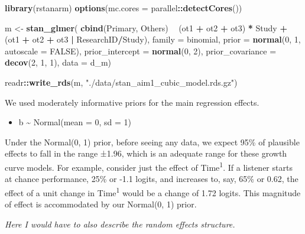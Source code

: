 \documentclass [11pt, proquest] {uwthesis}[2015/03/03]
\providecommand{\tightlist}{%
  \setlength{\itemsep}{0pt}\setlength{\parskip}{0pt}}
\newenvironment{Shaded}{}{}
\newcommand{\KeywordTok}[1]{\textcolor[rgb]{0.00,0.44,0.13}{\textbf{{#1}}}}
\newcommand{\DataTypeTok}[1]{\textcolor[rgb]{0.56,0.13,0.00}{{#1}}}
\newcommand{\DecValTok}[1]{\textcolor[rgb]{0.25,0.63,0.44}{{#1}}}
\newcommand{\StringTok}[1]{\textcolor[rgb]{0.25,0.44,0.63}{{#1}}}
\newcommand{\OtherTok}[1]{\textcolor[rgb]{0.00,0.44,0.13}{{#1}}}
\newcommand{\NormalTok}[1]{{#1}}
\newcommand{\OperatorTok}[1]{\textcolor[rgb]{0.00,0.44,0.13}{\textbf{{#1}}}}
\begin{document}
\begin{Shaded}
\begin{Highlighting}[]
\KeywordTok{library}\NormalTok{(rstanarm)}
\KeywordTok{options}\NormalTok{(}\DataTypeTok{mc.cores =}\NormalTok{ parallel}\OperatorTok{::}\KeywordTok{detectCores}\NormalTok{())}

\NormalTok{m <-}\StringTok{ }\KeywordTok{stan_glmer}\NormalTok{(}
  \KeywordTok{cbind}\NormalTok{(Primary, Others) }\OperatorTok{~}
\StringTok{    }\NormalTok{(ot1 }\OperatorTok{+}\StringTok{ }\NormalTok{ot2 }\OperatorTok{+}\StringTok{ }\NormalTok{ot3) }\OperatorTok{*}\StringTok{ }\NormalTok{Study }\OperatorTok{+}
\StringTok{    }\NormalTok{(ot1 }\OperatorTok{+}\StringTok{ }\NormalTok{ot2 }\OperatorTok{+}\StringTok{ }\NormalTok{ot3 }\OperatorTok{|}\StringTok{ }\NormalTok{ResearchID}\OperatorTok{/}\NormalTok{Study),}
  \DataTypeTok{family =}\NormalTok{ binomial,}
  \DataTypeTok{prior =} \KeywordTok{normal}\NormalTok{(}\DecValTok{0}\NormalTok{, }\DecValTok{1}\NormalTok{, }\DataTypeTok{autoscale =} \OtherTok{FALSE}\NormalTok{),}
  \DataTypeTok{prior_intercept =} \KeywordTok{normal}\NormalTok{(}\DecValTok{0}\NormalTok{, }\DecValTok{2}\NormalTok{),}
  \DataTypeTok{prior_covariance =} \KeywordTok{decov}\NormalTok{(}\DecValTok{2}\NormalTok{, }\DecValTok{1}\NormalTok{, }\DecValTok{1}\NormalTok{),}
  \DataTypeTok{data =}\NormalTok{ d_m)}

\NormalTok{readr}\OperatorTok{::}\KeywordTok{write_rds}\NormalTok{(m, }\StringTok{"./data/stan_aim1_cubic_model.rds.gz"}\NormalTok{)}
\end{Highlighting}
\end{Shaded}
We used moderately informative priors for the main regression effects.
\begin{itemize}
\tightlist
\item
  b \textasciitilde{} Normal(mean = 0, sd = 1)
\end{itemize}
Under the Normal(0, 1) prior, before seeing any data, we expect 95\% of
plausible effects to fall in the range ±1.96, which is an adequate range
for these growth curve models. For example, consider just the effect of
Time\textsuperscript{1}. If a listener starts at chance performance,
25\% or -1.1 logits, and increases to, say, 65\% or 0.62, the effect of
a unit change in Time\textsuperscript{1} would be a change of 1.72
logits. This magnitude of effect is accommodated by our Normal(0, 1)
prior.

\emph{Here I would have to also describe the random effects structure.}
\end{document}

